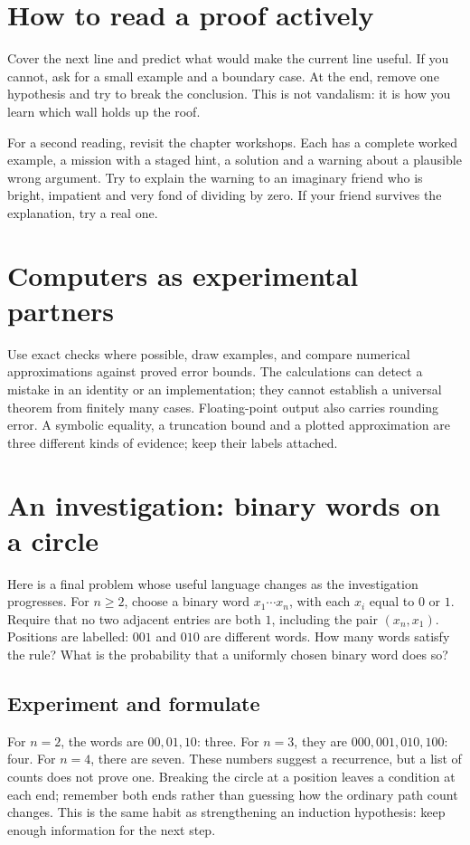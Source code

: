 \section*{How to read a proof actively}
Cover the next line and predict what would make the current line useful. If you cannot, ask for a small example and a boundary case. At the end, remove one hypothesis and try to break the conclusion. This is not vandalism: it is how you learn which wall holds up the roof.

For a second reading, revisit the chapter workshops. Each has a complete worked example, a mission with a staged hint, a solution and a warning about a plausible wrong argument. Try to explain the warning to an imaginary friend who is bright, impatient and very fond of dividing by zero. If your friend survives the explanation, try a real one.

\section*{Computers as experimental partners}
Use exact checks where possible, draw examples, and compare numerical approximations against proved error bounds. The calculations can detect a mistake in an identity or an implementation; they cannot establish a universal theorem from finitely many cases. Floating-point output also carries rounding error. A symbolic equality, a truncation bound and a plotted approximation are three different kinds of evidence; keep their labels attached.

\section*{An investigation: binary words on a circle}
Here is a final problem whose useful language changes as the investigation
progresses. For $n\ge2$, choose a binary word $x_1\cdots x_n$, with each $x_i$
equal to $0$ or $1$. Require that no two adjacent entries are both $1$, including
the pair $(x_n,x_1)$. Positions are labelled: $001$ and $010$ are different words.
How many words satisfy the rule? What is the probability that a uniformly chosen
binary word does so?

\subsection*{Experiment and formulate}
For $n=2$, the words are $00,01,10$: three. For $n=3$, they are $000,001,010,100$:
four. For $n=4$, there are seven. These numbers suggest a recurrence, but a list
of counts does not prove one. Breaking the circle at a position leaves a condition
at each end; remember both ends rather than guessing how the ordinary path count
changes. This is the same habit as strengthening an induction hypothesis: keep
enough information for the next step.

